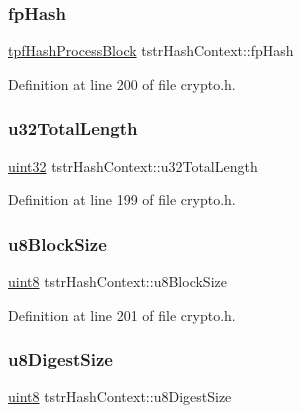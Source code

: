 \subsubsection{\texorpdfstring{fp\+Hash}{fpHash}}
{\footnotesize\ttfamily \hyperlink{third__party_2atmel_2devices_2wilc1000_2drv__hash_2crypto_8h_ac57cffcf2e97ad50284a1796cddcd0da}{tpf\+Hash\+Process\+Block} tstr\+Hash\+Context\+::fp\+Hash}



Definition at line 200 of file crypto.\+h.

\mbox{\label{structtstrHashContext_a1f34ee5e16cfba096d97cda5afcdf0d0}} 
\subsubsection{\texorpdfstring{u32\+Total\+Length}{u32TotalLength}}
{\footnotesize\ttfamily \hyperlink{group__DataT_ga100e7c691a47d6978527c479a0158245}{uint32} tstr\+Hash\+Context\+::u32\+Total\+Length}



Definition at line 199 of file crypto.\+h.

\mbox{\label{structtstrHashContext_a98d5af4e1c764a7b1571aa0ebdb4df6b}} 
\subsubsection{\texorpdfstring{u8\+Block\+Size}{u8BlockSize}}
{\footnotesize\ttfamily \hyperlink{group__DataT_ga4df709a77647e870bbf1d955b8edc9a6}{uint8} tstr\+Hash\+Context\+::u8\+Block\+Size}



Definition at line 201 of file crypto.\+h.

\mbox{\label{structtstrHashContext_a0ac827ded50656132aba2801121618e7}} 
\subsubsection{\texorpdfstring{u8\+Digest\+Size}{u8DigestSize}}
{\footnotesize\ttfamily \hyperlink{group__DataT_ga4df709a77647e870bbf1d955b8edc9a6}{uint8} tstr\+Hash\+Context\+::u8\+Digest\+Size}



